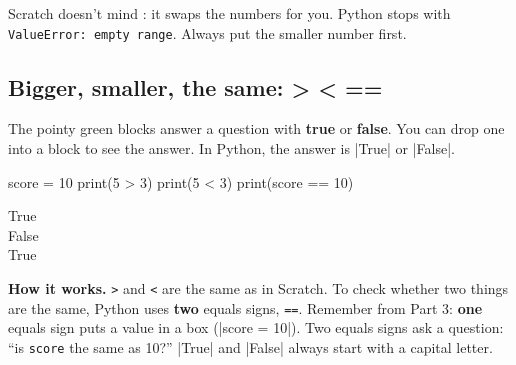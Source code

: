 \begin{watchout}
Scratch doesn't mind : it swaps the numbers for you. Python stops with \texttt{ValueError: empty range}. Always put the smaller number first.
\end{watchout}

\subsection*{Bigger, smaller, the same: > < ==}

The pointy green blocks answer a question with \textbf{true} or \textbf{false}. You can drop one into a  block to see the answer. In Python, the answer is \py|True| or \py|False|.

\begin{tcbraster}[raster columns=2, raster equal height=rows, raster column skip=12pt, raster valign=center, raster force size=false, raster odd column/.style={add to width=-1.2cm}, raster even column/.style={add to width=1.2cm}]
\begin{tcolorbox}[colback=white, colframe=white, boxrule=0pt, valign=center]
\begin{scratch}
\end{scratch}
\end{tcolorbox}
\begin{tcolorbox}[colback=white, colframe=white, boxrule=0pt, left=0pt, right=0pt, top=0pt, bottom=0pt, valign=center]
\begin{code}
score = 10
print(5 > 3)
print(5 < 3)
print(score == 10)
\end{code}
\begin{outputbox}
True\\
False\\
True
\end{outputbox}
\end{tcolorbox}
\end{tcbraster}

\textbf{How it works.} \texttt{>} and \texttt{<} are the same as in Scratch. To check whether two things are the same, Python uses \textbf{two} equals signs, \texttt{==}. Remember from Part 3: \textbf{one} equals sign puts a value in a box (\py|score = 10|). Two equals signs ask a question: ``is \texttt{score} the same as 10?'' \py|True| and \py|False| always start with a capital letter.

